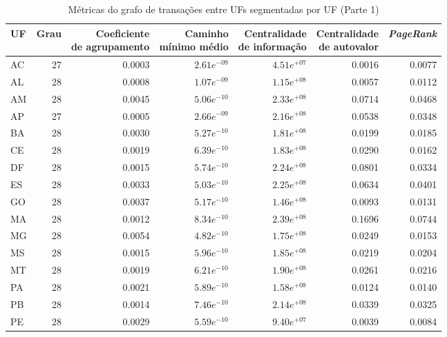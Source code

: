 \begin{table}[htb]
\centering
\caption{Métricas do grafo de transações entre UFs segmentadas por UF (Parte 1)}
\label{tab:metricas-redes:grafo-por-uf-especificas1}
    \begin{tabular}{l|rrrrrr}
    \toprule
    UF & Grau & \shortstack{Coeficiente\\de agrupamento} &  \shortstack{Caminho\\mínimo médio} & \shortstack{Centralidade\\de informação} &  \shortstack{Centralidade\\de autovalor} &  \textit{PageRank} \\
    \midrule
    AC   &  27 &  0.0003 &  $2.61e^{-09}$ &  $4.51e^{+07}$ &  0.0016 &  0.0077 \\
    AL   &  28 &  0.0008 &  $1.07e^{-09}$ &  $1.15e^{+08}$ &  0.0057 &  0.0112 \\
    AM   &  28 &  0.0045 &  $5.06e^{-10}$ &  $2.33e^{+08}$ &  0.0714 &  0.0468 \\
    AP   &  27 &  0.0005 &  $2.66e^{-09}$ &  $2.16e^{+08}$ &  0.0538 &  0.0348 \\
    BA   &  28 &  0.0030 &  $5.27e^{-10}$ &  $1.81e^{+08}$ &  0.0199 &  0.0185 \\
    CE   &  28 &  0.0019 &  $6.39e^{-10}$ &  $1.83e^{+08}$ &  0.0290 &  0.0162 \\
    DF   &  28 &  0.0015 &  $5.74e^{-10}$ &  $2.24e^{+08}$ &  0.0801 &  0.0334 \\
    ES   &  28 &  0.0033 &  $5.03e^{-10}$ &  $2.25e^{+08}$ &  0.0634 &  0.0401 \\
    GO   &  28 &  0.0037 &  $5.17e^{-10}$ &  $1.46e^{+08}$ &  0.0093 &  0.0131 \\
    MA   &  28 &  0.0012 &  $8.34e^{-10}$ &  $2.39e^{+08}$ &  0.1696 &  0.0744 \\
    MG   &  28 &  0.0054 &  $4.82e^{-10}$ &  $1.75e^{+08}$ &  0.0249 &  0.0153 \\
    MS   &  28 &  0.0015 &  $5.96e^{-10}$ &  $1.85e^{+08}$ &  0.0219 &  0.0204 \\
    MT   &  28 &  0.0019 &  $6.21e^{-10}$ &  $1.90e^{+08}$ &  0.0261 &  0.0216 \\
    PA   &  28 &  0.0021 &  $5.89e^{-10}$ &  $1.58e^{+08}$ &  0.0124 &  0.0140 \\
    PB   &  28 &  0.0014 &  $7.46e^{-10}$ &  $2.14e^{+08}$ &  0.0339 &  0.0325 \\
    PE   &  28 &  0.0029 &  $5.59e^{-10}$ &  $9.40e^{+07}$ &  0.0039 &  0.0084 \\

\end{tabular}
\end{table}
